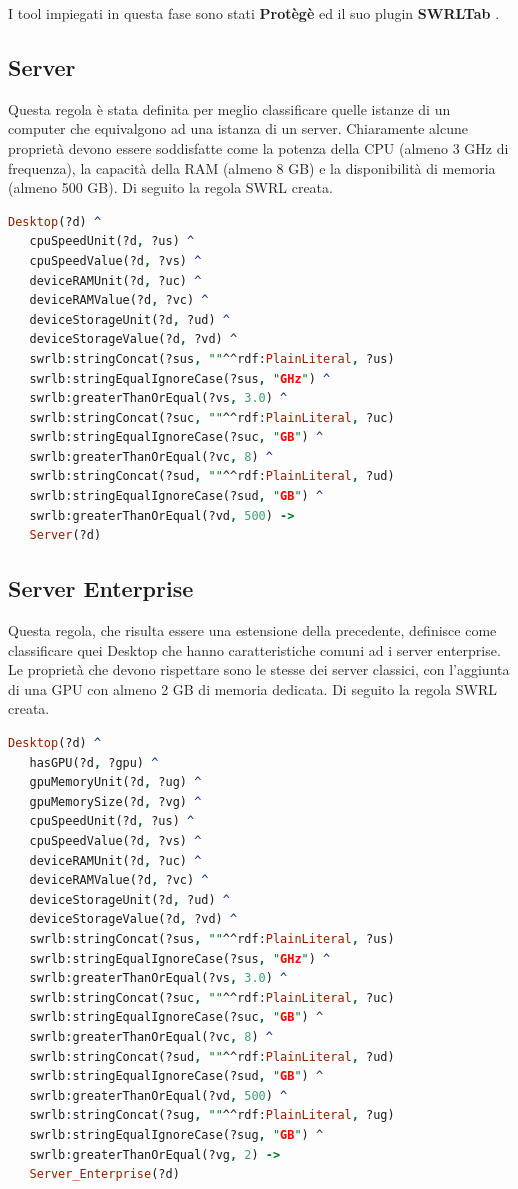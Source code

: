 I tool impiegati in questa fase sono stati \textbf{Protègè} \cite{protegehomepage} ed il suo plugin \textbf{SWRLTab} \cite{SWRLTabplugin}.
\newpage 
\subsection{Server}
Questa regola è stata definita per meglio classificare quelle istanze di un computer che equivalgono ad una istanza di un server. Chiaramente alcune proprietà devono essere soddisfatte come la potenza della CPU (almeno 3 GHz di frequenza), la capacità della RAM (almeno 8 GB) e la disponibilità di memoria (almeno 500 GB). Di seguito la regola SWRL creata.\\

\begin{lstlisting}[language=Prolog]
Desktop(?d) ^
   cpuSpeedUnit(?d, ?us) ^ 
   cpuSpeedValue(?d, ?vs) ^
   deviceRAMUnit(?d, ?uc) ^
   deviceRAMValue(?d, ?vc) ^
   deviceStorageUnit(?d, ?ud) ^
   deviceStorageValue(?d, ?vd) ^
   swrlb:stringConcat(?sus, ""^^rdf:PlainLiteral, ?us)
   swrlb:stringEqualIgnoreCase(?sus, "GHz") ^
   swrlb:greaterThanOrEqual(?vs, 3.0) ^
   swrlb:stringConcat(?suc, ""^^rdf:PlainLiteral, ?uc)
   swrlb:stringEqualIgnoreCase(?suc, "GB") ^
   swrlb:greaterThanOrEqual(?vc, 8) ^
   swrlb:stringConcat(?sud, ""^^rdf:PlainLiteral, ?ud)
   swrlb:stringEqualIgnoreCase(?sud, "GB") ^
   swrlb:greaterThanOrEqual(?vd, 500) ->
   Server(?d)
\end{lstlisting}
\newpage
\subsection{Server Enterprise}
Questa regola, che risulta essere una estensione della precedente, definisce come classificare quei Desktop che hanno caratteristiche comuni ad i server enterprise. Le proprietà che devono rispettare sono le stesse dei server classici, con l'aggiunta di una GPU con almeno 2 GB di memoria dedicata. Di seguito la regola SWRL creata.\\

\begin{lstlisting}[language=Prolog]
Desktop(?d) ^
   hasGPU(?d, ?gpu) ^
   gpuMemoryUnit(?d, ?ug) ^
   gpuMemorySize(?d, ?vg) ^		
   cpuSpeedUnit(?d, ?us) ^ 
   cpuSpeedValue(?d, ?vs) ^
   deviceRAMUnit(?d, ?uc) ^
   deviceRAMValue(?d, ?vc) ^
   deviceStorageUnit(?d, ?ud) ^
   deviceStorageValue(?d, ?vd) ^
   swrlb:stringConcat(?sus, ""^^rdf:PlainLiteral, ?us)
   swrlb:stringEqualIgnoreCase(?sus, "GHz") ^
   swrlb:greaterThanOrEqual(?vs, 3.0) ^
   swrlb:stringConcat(?suc, ""^^rdf:PlainLiteral, ?uc)
   swrlb:stringEqualIgnoreCase(?suc, "GB") ^
   swrlb:greaterThanOrEqual(?vc, 8) ^
   swrlb:stringConcat(?sud, ""^^rdf:PlainLiteral, ?ud)
   swrlb:stringEqualIgnoreCase(?sud, "GB") ^
   swrlb:greaterThanOrEqual(?vd, 500) ^
   swrlb:stringConcat(?sug, ""^^rdf:PlainLiteral, ?ug)
   swrlb:stringEqualIgnoreCase(?sug, "GB") ^
   swrlb:greaterThanOrEqual(?vg, 2) ->
   Server_Enterprise(?d)
\end{lstlisting}
\newpage
